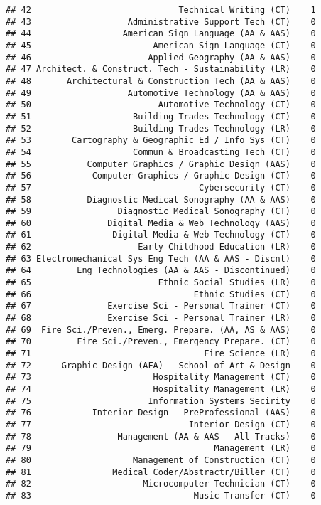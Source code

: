 \documentclass[]{article}
\begin{document}
\begin{verbatim}
## 42                             Technical Writing (CT)    1
## 43                   Administrative Support Tech (CT)    0
## 44                  American Sign Language (AA & AAS)    0
## 45                        American Sign Language (CT)    0
## 46                       Applied Geography (AA & AAS)    0
## 47 Architect. & Construct. Tech - Sustainability (LR)    0
## 48       Architectural & Construction Tech (AA & AAS)    0
## 49                   Automotive Technology (AA & AAS)    0
## 50                         Automotive Technology (CT)    0
## 51                    Building Trades Technology (CT)    0
## 52                    Building Trades Technology (LR)    0
## 53        Cartography & Geographic Ed / Info Sys (CT)    0
## 54                    Commun & Broadcasting Tech (CT)    0
## 55           Computer Graphics / Graphic Design (AAS)    0
## 56            Computer Graphics / Graphic Design (CT)    0
## 57                                 Cybersecurity (CT)    0
## 58           Diagnostic Medical Sonography (AA & AAS)    0
## 59                 Diagnostic Medical Sonography (CT)    0
## 60               Digital Media & Web Technology (AAS)    0
## 61                Digital Media & Web Technology (CT)    0
## 62                     Early Childhood Education (LR)    0
## 63 Electromechanical Sys Eng Tech (AA & AAS - Discnt)    0
## 64         Eng Technologies (AA & AAS - Discontinued)    0
## 65                         Ethnic Social Studies (LR)    0
## 66                                Ethnic Studies (CT)    0
## 67               Exercise Sci - Personal Trainer (CT)    0
## 68               Exercise Sci - Personal Trainer (LR)    0
## 69  Fire Sci./Preven., Emerg. Prepare. (AA, AS & AAS)    0
## 70         Fire Sci./Preven., Emergency Prepare. (CT)    0
## 71                                  Fire Science (LR)    0
## 72      Graphic Design (AFA) - School of Art & Design    0
## 73                        Hospitality Management (CT)    0
## 74                        Hospitality Management (LR)    0
## 75                       Information Systems Secirity    0
## 76            Interior Design - PreProfessional (AAS)    0
## 77                               Interior Design (CT)    0
## 78                 Management (AA & AAS - All Tracks)    0
## 79                                    Management (LR)    0
## 80                    Management of Construction (CT)    0
## 81                Medical Coder/Abstractr/Biller (CT)    0
## 82                      Microcomputer Technician (CT)    0
## 83                                Music Transfer (CT)    0

\end{verbatim}
\end{document}
